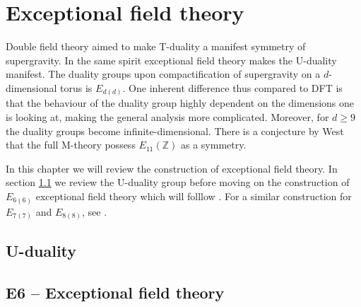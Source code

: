 \chapter{Exceptional field theory}

Double field theory aimed to make T-duality a manifest symmetry of supergravity. In the same spirit exceptional field theory makes the U-duality manifest. The duality groups upon compactification of supergravity on a $d$-dimensional torus is $E_{d(d)}$. One inherent difference thus compared to DFT is that the behaviour of the duality group highly dependent on the dimensions one is looking at, making the general analysis more complicated. Moreover, for $d\geq 9$ the duality groups become infinite-dimensional. There is a conjecture by West \cite{West2011} that the full M-theory possess $E_{11}(\mathbb{Z})$ as a symmetry. 

In this chapter we will review the construction of exceptional field theory. In section \ref{sec:Uduality} we review the U-duality group before moving on the construction of $E_{6(6)}$ exceptional field theory which will folllow \cite{E62014}. For a similar construction for $E_{7(7)}$ and $E_{8(8)}$, see \cite{E72014,E82014}. 



\section{U-duality}\label{sec:Uduality}



\section{E6 -- Exceptional field theory }